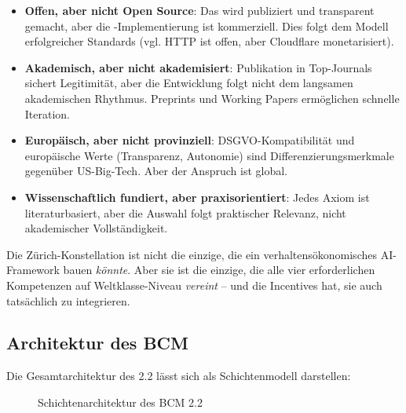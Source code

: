 \begin{itemize}
    \item \textbf{Offen, aber nicht Open Source}: Das \BCM{} wird publiziert und transparent gemacht, aber die \BEATRIX-Implementierung ist kommerziell. Dies folgt dem Modell erfolgreicher Standards (vgl. HTTP ist offen, aber Cloudflare monetarisiert).

    \item \textbf{Akademisch, aber nicht akademisiert}: Publikation in Top-Journals sichert Legitimität, aber die Entwicklung folgt nicht dem langsamen akademischen Rhythmus. Preprints und Working Papers ermöglichen schnelle Iteration.

    \item \textbf{Europäisch, aber nicht provinziell}: DSGVO-Kompatibilität und europäische Werte (Transparenz, Autonomie) sind Differenzierungsmerkmale gegenüber US-Big-Tech. Aber der Anspruch ist global.

    \item \textbf{Wissenschaftlich fundiert, aber praxisorientiert}: Jedes Axiom ist literaturbasiert, aber die Auswahl folgt praktischer Relevanz, nicht akademischer Vollständigkeit.
\end{itemize}

Die Zürich-Konstellation ist nicht die einzige, die ein verhaltensökonomisches AI-Framework bauen \textit{könnte}. Aber sie ist die einzige, die alle vier erforderlichen Kompetenzen auf Weltklasse-Niveau \textit{vereint} -- und die Incentives hat, sie auch tatsächlich zu integrieren.

\subsection{Architektur des BCM}

Die Gesamtarchitektur des \BCM{} 2.2 lässt sich als Schichtenmodell darstellen:

\begin{figure}[h]
\centering
{}
\caption{Schichtenarchitektur des BCM 2.2}
\label{fig:architecture}
\end{figure}

